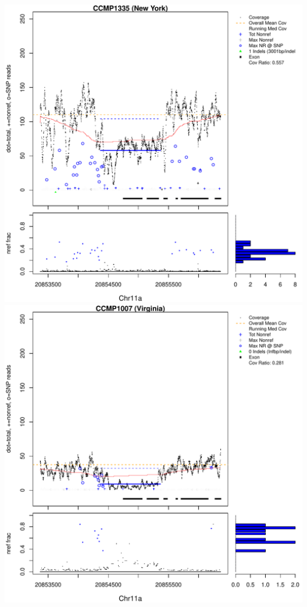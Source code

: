 \documentclass{article}\usepackage[]{graphicx}\usepackage[]{color}
\makeatletter
\def\maxwidth{ %
  \ifdim\Gin@nat@width>\linewidth
    \linewidth
  \else
    \Gin@nat@width
  \fi
}
\newenvironment{knitrout}{}{} %
\makeatother
\begin{document}
\begin{knitrout}
{\centering \includegraphics[width=\maxwidth]{figs-knitr/unnamed-chunk-51-1} 
\includegraphics[width=\maxwidth]{figs-knitr/unnamed-chunk-51-2} 
}
\end{knitrout}
\end{document}
